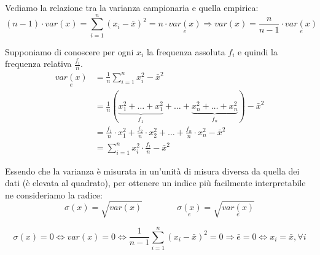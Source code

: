 \begin{observation}
	Vediamo la relazione tra la varianza campionaria e quella empirica:
	\begin{equation*}
		(n-1)\cdot var(x) = \sum_{i=1}^{n}(x_i - \bar{x})^2 = n \cdot \underset{e}{var(x)} \Rightarrow var(x) = \frac{n}{n-1}\cdot\underset{e}{var(x)}
	\end{equation*}
\end{observation}

\begin{definition}
	Supponiamo di conoscere per ogni $x_i$ la frequenza assoluta $f_i$ e quindi la frequenza relativa $\frac{f_i}{n}$.
	\begin{align}
		\underset{e}{var(x)} & =\frac{1}{n}\sum_{i=1}^{n}x_i^2 - \bar{x}^2 \\
		& = \frac{1}{n} (\underbrace{x_1^2+\ldots+x_1^2}_{f_1}+\ldots+\underbrace{x_n^2+\ldots+x_n^2}_{f_n})-\bar{x}^2\\
		& = \frac{f_1}{n}\cdot x_1^2 +\frac{f_2}{n} \cdot x_2^2 + \ldots + \frac{f_n}{n} \cdot x_n^2 - \bar{x}^2 \\
		& = \sum_{i=1}^{n} x_i^2 \cdot \frac{f_i}{n} - \bar{x}^2
	\end{align}
\end{definition}

\begin{definition}
	Essendo che la varianza è misurata in un'unità di misura diversa da quella dei dati (è elevata al quadrato), per ottenere un indice più facilmente interpretabile ne consideriamo la radice:
	\begin{equation}
		\sigma(x)=\sqrt{var(x)} \qquad \qquad \underset{e}{\sigma(x)} = \sqrt{\underset{e}{var(x)}}
	\end{equation}
\end{definition}

\begin{observation}
	\begin{equation*}
		\sigma(x) = 0\Leftrightarrow var(x)=0 \Leftrightarrow \frac{1}{n-1} \sum_{i=1}^{n}(x_i - \bar{x})^2 = 0\Rightarrow \bar{e}=0 \Leftrightarrow x_i = \bar{x}, \forall i
	\end{equation*}
\end{observation}

